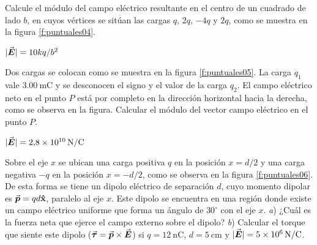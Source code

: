 %
\begin{minipage}[t]{.5\textwidth}
\begin{center}
\end{center}
\end{minipage}
%
\begin{Exercise}\label{p:puntuales04}
  Calcule el módulo del campo eléctrico resultante en el centro de un cuadrado de lado $b$, en cuyos vértices se sitúan las cargas $q$, $2q$, $-4q$ y $2q$, como se muestra en la figura \ref{f:puntuales04}.
\end{Exercise}
\begin{Answer}
  $|\va*{E}| = 10kq/b^2$
\end{Answer}
%
\begin{Exercise}\label{p:puntuales05}
  Dos cargas se colocan como se muestra en la figura \ref{f:puntuales05}. La carga $q_1$ vale $\SI{3.00}{\milli\coulomb}$ y se desconocen el signo y el valor de la carga $q_2$. El campo eléctrico neto en el punto $P$ está por completo en la dirección horizontal hacia la derecha, como se observa en la figura. Calcular el módulo del vector campo eléctrico en el punto $P$.
\end{Exercise}
\begin{Answer}
  $|\va*{E}| = \SI{2.8E10}{\newton/\coulomb}$
\end{Answer}
%
\begin{Exercise}\label{p:puntuales06}
  Sobre el eje $x$ se ubican una carga positiva $q$ en la posición $x = d/2$ y una carga negativa $-q$ en la posición $x = -d/2$, como se observa en la figura \ref{f:puntuales06}. De esta forma se tiene un dipolo eléctrico de separación $d$, cuyo momento dipolar es $\va*{p}=qd\vu{x}$, paralelo al eje $x$. Este dipolo se encuentra en una región donde existe un campo eléctrico uniforme que forma un ángulo de $30^\circ$ con el eje $x$. \textit{a}) ¿Cuál es la fuerza neta que ejerce el campo externo sobre el dipolo? \textit{b}) Calcular el torque que siente este dipolo ($\va*{\tau} = \va*{p} \times \va*{E}$) si $q = \SI{12}{\nano\coulomb}$, $d = \SI{5}{\centi\metre}$ y $|\va*{E}| = \SI{5E6}{\newton/\coulomb}$.
\end{Exercise}
